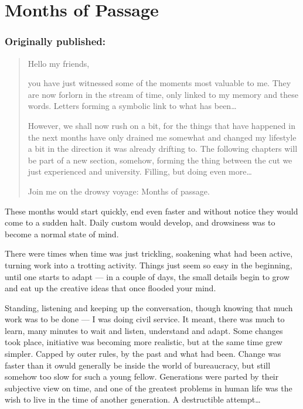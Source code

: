 \chapter{Months of Passage}
\label{cha:months-passage}
\subsection*{Originally published: }
\begin{quote}
Hello my friends, 

you have just witnessed some of the moments most valuable to me. They are now forlorn in the stream of time, only linked to my memory and these words. Letters forming a symbolic link to what has been\dots{}

However, we shall now rush on a bit, for the things that have happened in the next months have only drained me somewhat and changed my lifestyle a bit in the direction it was already drifting to. The following chapters will be part of a new section, somehow, forming the thing between the cut we just experienced and university. Filling, but doing even more\dots{}

Join me on the drowsy voyage: Months of passage.
\end{quote}

These months would start quickly, end even faster and without notice they would come to a sudden halt. Daily custom would develop, and drowsiness was to become a normal state of mind.

There were times when time was just trickling, soakening what had been active, turning work into a trotting activity. Things just seem so easy in the beginning, until one starts to adapt --- in a couple of days, the small details begin to grow and eat up the creative ideas that once flooded your mind.

Standing, listening and keeping up the conversation, though knowing that much work was to be done --- I was doing civil service. It meant, there was much to learn, many minutes to wait and listen, understand and adapt. Some changes took place, initiative was becoming more realistic, but at the same time grew simpler. Capped by outer rules, by the past and what had been. Change was faster than it owuld generally be inside the world of bureaucracy, but still somehow too slow for such a young fellow. Generations were parted by their subjective view on time, and one of the greatest problems in human life was the wish to live in the time of another generation. A destructible attempt\dots{}


